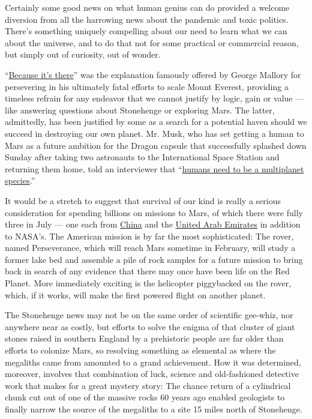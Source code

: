 Certainly some good news on what human genius can do provided a welcome
diversion from all the harrowing news about the pandemic and toxic
politics. There's something uniquely compelling about our need to learn
what we can about the universe, and to do that not for some practical or
commercial reason, but simply out of curiosity, out of wonder.

``\href{https://www.nytimes3xbfgragh.onion/1923/03/18/archives/climbing-mount-everest-is-work-for-supermen-a-member-of-former.html}{Because
it's there}'' was the explanation famously offered by George Mallory for
persevering in his ultimately fatal efforts to scale Mount Everest,
providing a timeless refrain for any endeavor that we cannot justify by
logic, gain or value --- like answering questions about Stonehenge or
exploring Mars. The latter, admittedly, has been justified by some as a
search for a potential haven should we succeed in destroying our own
planet. Mr. Musk, who has set getting a human to Mars as a future
ambition for the Dragon capsule that successfully splashed down Sunday
after taking two astronauts to the International Space Station and
returning them home, told an interviewer that
``\href{https://slate.com/technology/2015/04/elon-musk-and-mars-spacex-ceo-and-our-multiplanet-species.html}{humans
need to be a multiplanet species}.''

It would be a stretch to suggest that survival of our kind is really a
serious consideration for spending billions on missions to Mars, of
which there were fully three in July --- one each from
\href{https://www.nature.com/articles/d41586-020-02187-7}{China} and the
\href{https://www.cnn.com/2020/07/19/middleeast/uae-mars-hope-launch-intl-hnk-scn-scli/index.html}{United
Arab Emirates} in addition to NASA's. The American mission is by far the
most sophisticated: The rover, named Perseverance, which will reach Mars
sometime in February, will study a former lake bed and assemble a pile
of rock samples for a future mission to bring back in search of any
evidence that there may once have been life on the Red Planet. More
immediately exciting is the helicopter piggybacked on the rover, which,
if it works, will make the first powered flight on another planet.

The Stonehenge news may not be on the same order of scientific gee-whiz,
nor anywhere near as costly, but efforts to solve the enigma of that
cluster of giant stones raised in southern England by a prehistoric
people are far older than efforts to colonize Mars, so resolving
something as elemental as where the megaliths came from amounted to a
grand achievement. How it was determined, moreover, involves that
combination of luck, science and old-fashioned detective work that makes
for a great mystery story: The chance return of a cylindrical chunk cut
out of one of the massive rocks 60 years ago enabled geologists to
finally narrow the source of the megaliths to a site 15 miles north of
Stonehenge.

